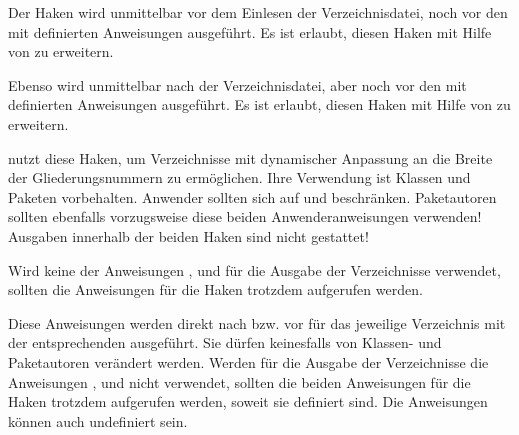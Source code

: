 \begin{Declaration}
\end{Declaration}
Der Haken  wird unmittelbar vor dem
Einlesen der Verzeichnisdatei, noch vor den mit
 definierten Anweisungen
ausgeführt. Es ist erlaubt, diesen Haken mit Hilfe von
 zu erweitern.

Ebenso wird  unmittelbar nach der
Verzeichnisdatei, aber noch vor den mit
 definierten Anweisungen
ausgeführt. Es ist erlaubt, diesen Haken mit Hilfe von
 zu erweitern.

\KOMAScript{} nutzt diese Haken, um Verzeichnisse mit dynamischer Anpassung an
die Breite der Gliederungsnummern zu ermöglichen. Ihre Verwendung ist Klassen
und Paketen vorbehalten. Anwender sollten sich auf
 und
 beschränken. Paketautoren sollten
ebenfalls vorzugsweise diese beiden Anwenderanweisungen verwenden!  Ausgaben
innerhalb der beiden Haken sind nicht gestattet!

Wird keine der Anweisungen
,  und
 für die Ausgabe der Verzeichnisse
verwendet, sollten die Anweisungen für die Haken trotzdem
aufgerufen werden.%
\EndIndexGroup


\begin{Declaration}
\end{Declaration}
Diese Anweisungen werden direkt nach
 bzw. vor
 für das jeweilige Verzeichnis
mit der entsprechenden 
ausgeführt. Sie  dürfen keinesfalls von Klassen- und
Paketautoren verändert werden. Werden für die Ausgabe der Verzeichnisse die
Anweisungen ,
 und 
nicht verwendet, sollten die beiden Anweisungen für die Haken
trotzdem aufgerufen werden, soweit sie definiert sind. Die Anweisungen können
auch undefiniert sein.%
\iffalse%
\ Für einen entsprechenden Test siehe
\DescRef{scrbase.cmd.scr@ifundefinedorrelax}\IndexCmd{scr@ifundefinedorrelax}
in \autoref{sec:scrbase.if},
\DescPageRef{scrbase.cmd.scr@ifundefinedorrelax}.%
\fi%
\EndIndexGroup


